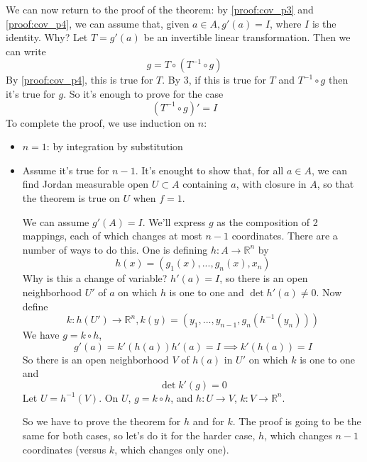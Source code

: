 \documentclass{article}
\newcommand{\reals}[0]{\mathbb{R}}
\begin{document}
We can now return to the proof of the theorem: by \ref{proof:cov_p3} and \ref{proof:cov_p4}, we can assume that, given \(a \in A, g'(a) = I\), where \(I\) is the identity. Why? Let \(T = g'(a)\) be an invertible linear transformation. Then we can write
\begin{equation}
  g = T \circ (T^{-1} \circ g)
\end{equation}
By \ref{proof:cov_p4}, this is true for \(T\). By 3, if this is true for \(T\) and \(T^{-1} \circ g\) then it's true for \(g\). So it's enough to prove for the case
\begin{equation}
    (T^{-1} \circ g)' = I
\end{equation}
To complete the proof, we use induction on \(n\):
\begin{itemize}

  \item \(n = 1\): by integration by substitution

  \item Assume it's true for \(n - 1\). It's enought to show that, for all \(a \in A\), we can find Jordan measurable open \(U \subset A\) containing \(a\), with closure in \(A\), so that the theorem is true on \(U\) when \(f = 1\).

  We can assume \(g'(A) = I\). We'll express \(g\) as the composition of 2 mappings, each of which changes at most \(n - 1\) coordinates. There are a number of ways to do this. One is defining \(h : A \to \reals^n\) by
  \begin{equation}
    h(x) = (g_1(x),...,g_n(x), x_n)
  \end{equation}
  Why is this a change of variable? \(h'(a) = I\), so there is an open neighborhood \(U'\) of \(a\) on which \(h\) is one to one and \(\det h'(a) \neq 0\). Now define
  \begin{equation}
    k: h(U') \to \reals^n, k(y) = (y_1,...,y_{n - 1}, g_n(h^{-1}(y_n)))
  \end{equation}
  We have \(g = k \circ h\),
  \begin{equation}
    g'(a) = k'(h(a))h'(a) = I \implies k'(h(a)) = I
  \end{equation}
  So there is an open neighborhood \(V\) of \(h(a)\) in \(U'\) on which \(k\) is one to one and
  \begin{equation}
    \det k'(g) = 0
  \end{equation}
  Let \(U = h^{-1}(V)\). On \(U\), \(g = k \circ h\), and \(h: U \to V\), \(k: V \to \reals^n\).

  So we have to prove the theorem for \(h\) and for \(k\). The proof is going to be the same for both cases, so let's do it for the harder case, \(h\), which changes \(n - 1\) coordinates (versus \(k\), which changes only one).


\end{itemize}
\end{document}
